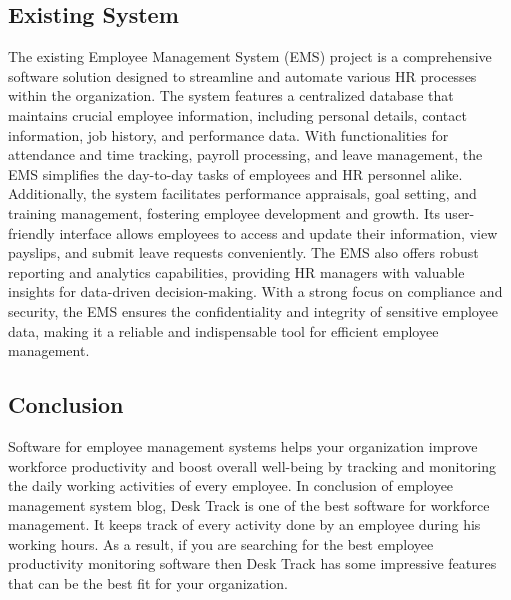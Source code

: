 \subsection{Existing System}
The existing Employee Management System (EMS) project is a comprehensive software solution designed to streamline and automate various HR processes within the organization. The system features a centralized database that maintains crucial employee information, including personal details, contact information, job history, and performance data. With functionalities for attendance and time tracking, payroll processing, and leave management, the EMS simplifies the day-to-day tasks of employees and HR personnel alike. Additionally, the system facilitates performance appraisals, goal setting, and training management, fostering employee development and growth. Its user-friendly interface allows employees to access and update their information, view payslips, and submit leave requests conveniently. The EMS also offers robust reporting and analytics capabilities, providing HR managers with valuable insights for data-driven decision-making. With a strong focus on compliance and security, the EMS ensures the confidentiality and integrity of sensitive employee data, making it a reliable and indispensable tool for efficient employee management.
\subsection{Conclusion}
Software for employee management systems helps your organization improve workforce productivity and boost overall well-being by tracking and monitoring the daily working activities of every employee. In conclusion of employee management system blog, Desk Track is one of the best software for workforce management. It keeps track of every activity done by an employee during his working hours. As a result, if you are searching for the best employee productivity monitoring software then Desk Track has some impressive features that can be the best fit for your organization.
    